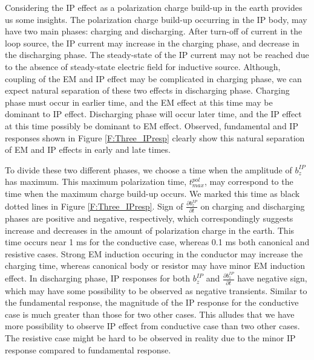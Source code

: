 \documentclass[a4paper, 11pt]{article}
\newcommand{\bzip}{b_z^{IP}}
\newcommand{\dbzdtip}{\frac{\partial b_z^{IP}}{\partial t}}
\begin{document}
Considering the IP effect as a polarization charge build-up in the earth provides us some insights.
The polarization charge build-up occurring in the IP body, may have two main phases: charging and discharging.
After turn-off of current in the loop source, the IP current may increase in the charging phase, and decrease in the discharging phase. 
The steady-state of the IP current may not be reached due to the absence of steady-state electric field for inductive source. 
Although, coupling of the EM and IP effect may be complicated in charging phase, we can expect natural separation of these two effects in discharging phase. 
Charging phase must occur in earlier time, and the EM effect at this time may be dominant to IP effect. 
Discharging phase will occur later time, and the IP effect at this time possibly be dominant to EM effect. 
Observed, fundamental and IP responses shown in Figure \ref{F:Three_IPresp} clearly show this natural separation of EM and IP effects in early and late times. 

To divide these two different phases, we choose a time when the amplitude of $\bzip$ has maximum. 
This maximum polarization time, $t^{pol}_{max}$, may correspond to the time when the maximum  charge build-up occurs. 
We marked this time as black dotted lines in Figure \ref{F:Three_IPresp}.
Sign of $\dbzdtip$ on charging and discharging phases are positive and negative, respectively, which correspondingly suggests increase and decreases in the amount of polarization charge in the earth. 
This time occurs near 1 ms for the conductive case, whereas 0.1 ms both canonical and resistive cases. 
Strong EM induction occuring in the conductor may increase the charging time, whereas canonical body or resistor may have minor EM induction effect. 
In discharging phase, IP responses for both $\bzip$ and $\dbzdtip$ have negative sign, which may have some possibility to be observed as negative transients. 
Similar to the fundamental response, the magnitude of the IP response for the conductive case is much greater than those for two other cases. 
This alludes that we have more possibility to observe IP effect from conductive case than two other cases. 
The resistive case might be hard to be observed in reality due to the minor IP response compared to fundamental response. 
\end{document}
